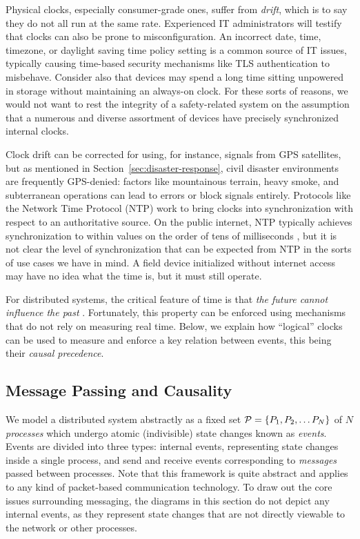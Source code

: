 \documentclass[]             %
{NASA}                       %
\theoremstyle{definition}
\begin{document}
Physical clocks, especially consumer-grade ones, suffer from
\emph{drift}, which is to say they do not all run at the same
rate. Experienced IT administrators will testify that clocks can also
be prone to misconfiguration. An incorrect date, time, timezone, or
daylight saving time policy setting is a common source of IT issues,
typically causing time-based security mechanisms like TLS
authentication to misbehave. Consider also that devices may spend a
long time sitting unpowered in storage without maintaining an
always-on clock. For these sorts of reasons, we would not want to rest
the integrity of a safety-related system on the assumption that a
numerous and diverse assortment of devices have precisely synchronized
internal clocks.

Clock drift can be corrected for using, for instance, signals from GPS
satellites, but as mentioned in Section~\ref{sec:disaster-response},
civil disaster environments are frequently GPS-denied: factors like
mountainous terrain, heavy smoke, and subterranean operations can lead
to errors or block signals entirely. Protocols like the Network Time
Protocol (NTP) \cite{rfc1119} work to bring clocks into
synchronization with respect to an authoritative source. On the public
internet, NTP typically achieves synchronization to within values on the
order of tens of milliseconds \cite{rfc1128}, but it is not clear the
level of synchronization that can be expected from NTP in the sorts of use
cases we have in mind. A field device initialized without internet
access may have no idea what the time is, but it must still operate.

For distributed systems, the critical feature of time is that
\emph{the future cannot influence the past}
\cite{1989mattern}. Fortunately, this property can be
enforced using mechanisms that do not rely on measuring real
time. Below, we explain how ``logical'' clocks can be used to
measure and enforce a key relation between events, this being their
\emph{causal precedence}.


\subsection{Message Passing and Causality}
\label{ssec:message-passing}
We model a distributed system abstractly as a fixed set
$\mathcal{P} = \{P_1, P_2, \ldots P_N\}$ of $N$ \emph{processes} which
undergo atomic (indivisible) state changes known as
\emph{events}. Events are divided into three types: internal events,
representing state changes inside a single process, and send and
receive events corresponding to \emph{messages} passed between
processes. Note that this framework is quite abstract and applies to
any kind of packet-based communication technology. To draw out the
core issues surrounding messaging, the diagrams in this section do not
depict any internal events, as they represent state changes that are
not directly viewable to the network or other processes.
\end{document}
